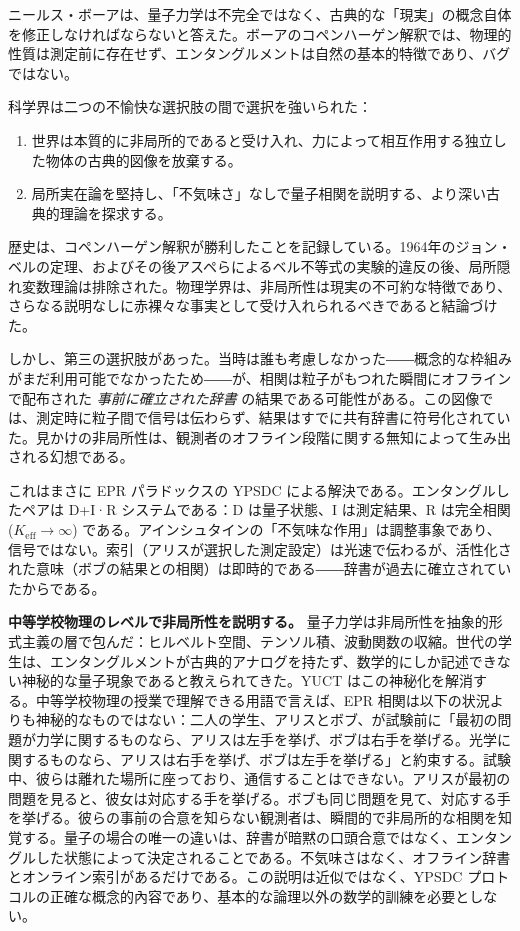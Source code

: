 \documentclass[12pt,a4paper]{article}
\begin{document}
	ニールス・ボーアは、量子力学は不完全ではなく、古典的な「現実」の概念自体を修正しなければならないと答えた。ボーアのコペンハーゲン解釈では、物理的性質は測定前に存在せず、エンタングルメントは自然の基本的特徴であり、バグではない。
	
	科学界は二つの不愉快な選択肢の間で選択を強いられた：
	\begin{enumerate}
		\item 世界は本質的に非局所的であると受け入れ、力によって相互作用する独立した物体の古典的図像を放棄する。
		\item 局所実在論を堅持し、「不気味さ」なしで量子相関を説明する、より深い古典的理論を探求する。
	\end{enumerate}
	
	歴史は、コペンハーゲン解釈が勝利したことを記録している。1964年のジョン・ベルの定理、およびその後アスペらによるベル不等式の実験的違反の後、局所隠れ変数理論は排除された。物理学界は、非局所性は現実の不可約な特徴であり、さらなる説明なしに赤裸々な事実として受け入れられるべきであると結論づけた。
	
	しかし、第三の選択肢があった。当時は誰も考慮しなかった――概念的な枠組みがまだ利用可能でなかったため――が、相関は粒子がもつれた瞬間にオフラインで配布された \emph{事前に確立された辞書} の結果である可能性がある。この図像では、測定時に粒子間で信号は伝わらず、結果はすでに共有辞書に符号化されていた。見かけの非局所性は、観測者のオフライン段階に関する無知によって生み出される幻想である。
	
	これはまさに EPR パラドックスの YPSDC による解決である。エンタングルしたペアは D+I·R システムである：D は量子状態、I は測定結果、R は完全相関 (\(K_{\mathrm{eff}} \to \infty\)) である。アインシュタインの「不気味な作用」は調整事象であり、信号ではない。索引（アリスが選択した測定設定）は光速で伝わるが、活性化された意味（ボブの結果との相関）は即時的である――辞書が過去に確立されていたからである。
	
	\textbf{中等学校物理のレベルで非局所性を説明する。} 量子力学は非局所性を抽象的形式主義の層で包んだ：ヒルベルト空間、テンソル積、波動関数の収縮。世代の学生は、エンタングルメントが古典的アナログを持たず、数学的にしか記述できない神秘的な量子現象であると教えられてきた。YUCT はこの神秘化を解消する。中等学校物理の授業で理解できる用語で言えば、EPR 相関は以下の状況よりも神秘的なものではない：二人の学生、アリスとボブ、が試験前に「最初の問題が力学に関するものなら、アリスは左手を挙げ、ボブは右手を挙げる。光学に関するものなら、アリスは右手を挙げ、ボブは左手を挙げる」と約束する。試験中、彼らは離れた場所に座っており、通信することはできない。アリスが最初の問題を見ると、彼女は対応する手を挙げる。ボブも同じ問題を見て、対応する手を挙げる。彼らの事前の合意を知らない観測者は、瞬間的で非局所的な相関を知覚する。量子の場合の唯一の違いは、辞書が暗黙の口頭合意ではなく、エンタングルした状態によって決定されることである。不気味さはなく、オフライン辞書とオンライン索引があるだけである。この説明は近似ではなく、YPSDC プロトコルの正確な概念的內容であり、基本的な論理以外の数学的訓練を必要としない。
	
\end{document}
